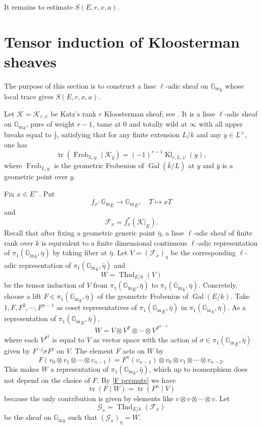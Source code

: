 \documentclass[11pt]{amsart}
\theoremstyle{remark}
\newcommand{\Gm}{\mathbb G_{\mathrm m}}
\newcommand{\Frob}{\operatorname{Frob}}
\newcommand{\Kl}{\operatorname{Kl}}
\newcommand{\TInd}{\operatorname{TInd}}
\newcommand{\Gal}{\operatorname{Gal}}
\newcommand{\cF}{\mathcal F}
\newcommand{\cK}{\mathcal K}
\newcommand{\cG}{\mathcal G}
\begin{document}
It remains to estimate $S(E,r,x,a)$.

\section{Tensor induction of Kloosterman sheaves}\label{sec:tensor-induction}

The purpose of this section is to construct a lisse $\ell$-adic sheaf on ${\Gm}_k$ whose local trace gives $S(E,r,x,a)$.

Let $\cK=\cK_{r,\psi}$ be Katz's rank $r$ Kloosterman sheaf; see \cite[Theorem~4.1.1]{KatzGKM}. It is a lisse $\ell$-adic sheaf on ${\Gm}_k$, pure of weight $r-1$, tame at $0$ and totally wild at $\infty$ with all upper breaks equal to $\frac{1}{r}$, satisfying that for any finite extension $L/k$ and any $y\in L^{\times}$, one has
\begin{equation}\label{eq:Kl-sheaf-trace}
    \operatorname{tr}(\Frob_{L,y}\mid \cK_{\bar y})=(-1)^{r-1}\Kl_{r,L,\psi}(y),
\end{equation}
where $\Frob_{L,y}$ is the geometric Frobenius of $\Gal(\bar{k}/L)$ at $y$ and $\bar{y}$ is a geometric point over $y$. 

Fix $x\in E^{\times}$. Put
\[
    f_x:{\Gm}_E\longrightarrow{\Gm}_E,
        \quad T\longmapsto xT
\]
and 
\[
    \cF_x=f_x^*(\cK|_E).
\]
Recall that after fixing a geometric generic point $\bar{\eta}$, a lisse $\ell$-adic sheaf of finite rank over $k$ is equivalent to a finite dimensional continuous $\ell$-adic representation of $\pi_1({\Gm}_k,\bar{\eta})$ by taking fiber at $\bar{\eta}$. Let $V = (\cF_x)_{\bar{\eta}}$ be the corresponding $\ell$-adic representation of $\pi_1({\Gm}_k,\bar{\eta})$ and 
\[
W = \TInd_{E/k}(V)
\] 
be the tensor induction of $V$ from $\pi_1({\Gm}_E,\bar{\eta})$ to $\pi_1({\Gm}_k,\bar{\eta})$. Concretely, choose a lift $F \in \pi_1({\Gm}_k,\bar{\eta})$ of the geometric Frobenius of $\Gal(E/k)$. Take $1, F, F^{2}, \cdots, F^{n-1}$ as coset representatives of $\pi_1({\Gm}_E,\bar{\eta})$ in $\pi_1({\Gm}_k,\bar{\eta})$. As a representation of $\pi_1({\Gm}_E,\bar{\eta})$,
\begin{equation}\label{tensor representation}
    W = V \otimes V^F \otimes \cdots \otimes V^{F^{n-1}}
\end{equation}
where each $V^{F^j}$ is equal to $V$ as vector space with the action of $\sigma\in\pi_1({\Gm}_E,\bar{\eta})$ given by $F^{-j} \sigma F^j$ on $V$. The element $F$ acts on $W$ by
\begin{equation}\label{F permute}
    F(v_0\otimes v_1\otimes\cdots\otimes v_{n-1})=F^n(v_{n-1})\otimes v_0\otimes v_1\otimes\cdots\otimes v_{n-2}.
\end{equation}
This makes $W$ a representation of $\pi_1({\Gm}_k,\bar{\eta})$, which up to isomorphism does not depend on the choice of $F$. By \eqref{F permute} we have
\begin{equation}\label{trace of tensor product}
    \operatorname{tr}(F\mid W)=\operatorname{tr}(F^n\mid V)
\end{equation}
because the only contribution is given by elements like $v\otimes v\otimes \cdots \otimes v$. Let 
\[
\cG_x=\TInd_{E/k}(\cF_x)
\]
be the sheaf on ${\Gm}_k$ such that $(\cG_x)_{\bar{\eta}}=W$.
  
\end{document}
